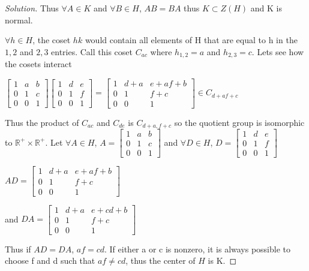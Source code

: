 \documentclass{article}
\newcommand{\R}{\mathbb{R}}
\newenvironment{solution}
{\renewcommand\qedsymbol{$\blacksquare$}\begin{proof}[Solution]}
{\end{proof}}
\begin{document}
\begin{solution}
    Thus $\forall A \in K$ and $\forall B \in H$, $AB = BA$ thus $K \subset Z(H)$ and K is normal.

    $\forall h \in H$, the coset $hk$ would contain all elements of H that are equal to h in the $1,2$ and $2,3$ entries. Call this coset $C_{ac}$ where $h_{1,2} = a$ and $h_{2, 3} = c$. Lets see how the cosets interact

    $\begin{bmatrix}
        1 & a & b \\ 
        0 & 1 & c \\ 
        0 & 0 & 1
    \end{bmatrix}\begin{bmatrix}
        1 & d & e \\ 
        0 & 1 & f \\ 
        0 & 0 & 1
    \end{bmatrix} = \begin{bmatrix}
        1 & d+a & e+af+b \\ 
        0 & 1 & f+c \\ 
        0 & 0 & 1
    \end{bmatrix} \in C_{d+a f+c}$

    Thus the product of $C_{ac}$ and $C_{de}$ is $C_{d+a, f+c}$ so the quotient group is isomorphic to $\R^+ \times \R^+$. Let $\forall A \in H$, $A = \begin{bmatrix}
        1 & a & b \\ 
        0 & 1 & c \\ 
        0 & 0 & 1
    \end{bmatrix}$ and $\forall D \in H$, $D = \begin{bmatrix}
        1 & d & e \\ 
        0 & 1 & f \\ 
        0 & 0 & 1
    \end{bmatrix}$


    $AD = \begin{bmatrix}
        1 & d+a & e+af+b \\ 
        0 & 1 & f+c \\ 
        0 & 0 & 1
    \end{bmatrix}$

    and $DA = \begin{bmatrix}
        1 & d+a & e+cd+b \\ 
        0 & 1 & f+c \\ 
        0 & 0 & 1
    \end{bmatrix}$

    Thus if $AD = DA$, $af = cd$. If either a
    or c is nonzero, it is always possible to choose f
    and d such that $af \neq cd$, thus the center of $H$ is K.
\end{solution}
\end{document}
